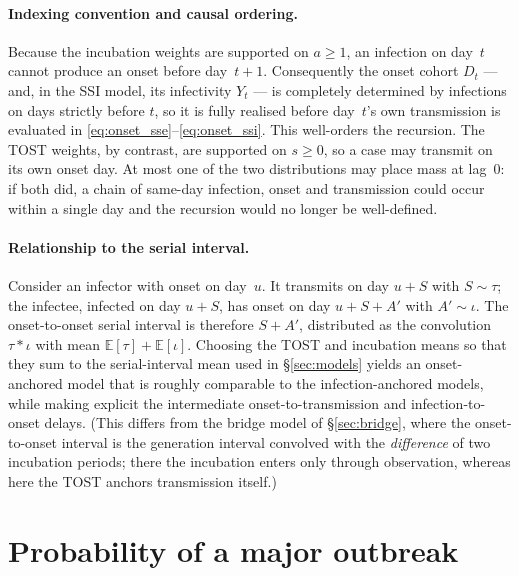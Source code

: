 \documentclass{article}
\theoremstyle{definition}
\begin{document}
\paragraph{Indexing convention and causal ordering.}
Because the incubation weights are supported on $a \geq 1$, an infection on
day~$t$ cannot produce an onset before day~$t+1$.  Consequently the onset cohort
$D_t$ --- and, in the SSI model, its infectivity $Y_t$ --- is completely
determined by infections on days strictly before $t$, so it is fully realised
before day~$t$'s own transmission is evaluated in
\eqref{eq:onset_sse}--\eqref{eq:onset_ssi}.  This well-orders the recursion.  The
TOST weights, by contrast, are supported on $s \geq 0$, so a case may transmit on
its own onset day.  At most one of the two distributions may place mass at
lag~0: if both did, a chain of same-day infection, onset and transmission could
occur within a single day and the recursion would no longer be well-defined.

\paragraph{Relationship to the serial interval.}
Consider an infector with onset on day~$u$.  It transmits on day $u + S$ with
$S \sim \tau$; the infectee, infected on day $u + S$, has onset on day
$u + S + A'$ with $A' \sim \iota$.  The onset-to-onset serial interval is
therefore $S + A'$, distributed as the convolution $\tau * \iota$ with mean
$\mathbb{E}[\tau] + \mathbb{E}[\iota]$.  Choosing the TOST and incubation means so
that they sum to the serial-interval mean used in \S\ref{sec:models} yields an
onset-anchored model that is roughly comparable to the infection-anchored models,
while making explicit the intermediate onset-to-transmission and
infection-to-onset delays.  (This differs from the bridge model of
\S\ref{sec:bridge}, where the onset-to-onset interval is the generation interval
convolved with the \emph{difference} of two incubation periods; there the
incubation enters only through observation, whereas here the TOST anchors
transmission itself.)

\section{Probability of a major outbreak}
\label{sec:onset_pmo}
\end{document}
